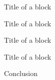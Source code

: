 \documentclass[draft,b0]{sciposter}
\begin{document}
\begin{multicols}{2}
		\begin{block}{Title of a block}
			\lipsum[4]
		\end{block}
		\begin{block}{Title of a block}
			\lipsum[2]
		\end{block}
		
		\begin{block}{Title of a block}
			\lipsum[3]
		\end{block}
		\begin{block}{Title of a block}
			\lipsum[4]
		\end{block}
		
		\begin{block}{Conclusion}
			\lipsum[1]
		\end{block}
		
	\end{multicols}
	
	
	
\end{document}
